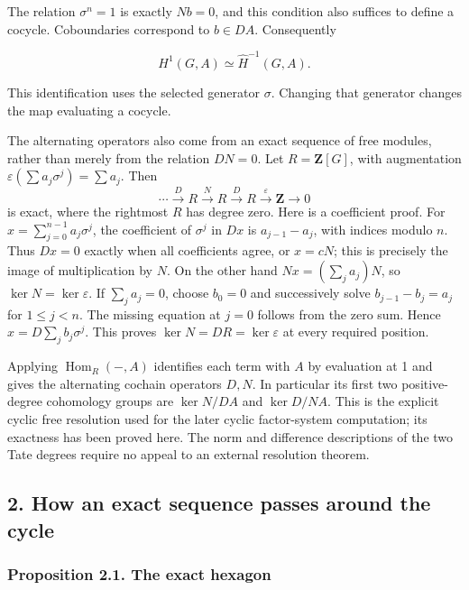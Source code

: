 \documentclass[11pt,a4paper]{article}
\begin{document}
The relation \(\sigma^n=1\) is exactly \(Nb=0\), and this condition also
suffices to define a cocycle. Coboundaries correspond to \(b\in DA\).
Consequently

\[
H^1(G,A)\simeq\widehat H^{-1}(G,A).
\]

This identification uses the selected generator \(\sigma\). Changing
that generator changes the map evaluating a cocycle.

The alternating operators also come from an exact sequence of free
modules, rather than merely from the relation \(DN=0\). Let
\(R=\mathbf Z[G]\), with augmentation
\(\varepsilon(\sum a_j\sigma^j)=\sum a_j\). Then \[
\cdots\xrightarrow{D}R\xrightarrow{N}R
\xrightarrow{D}R\xrightarrow{\varepsilon}\mathbf Z\longrightarrow0
\] is exact, where the rightmost \(R\) has degree zero. Here is a
coefficient proof. For \(x=\sum_{j=0}^{n-1}a_j\sigma^j\), the
coefficient of \(\sigma^j\) in \(Dx\) is \(a_{j-1}-a_j\), with indices
modulo \(n\). Thus \(Dx=0\) exactly when all coefficients agree, or
\(x=cN\); this is precisely the image of multiplication by \(N\). On the
other hand \(Nx=(\sum_j a_j)N\), so \(\ker N=\ker\varepsilon\). If
\(\sum_j a_j=0\), choose \(b_0=0\) and successively solve
\(b_{j-1}-b_j=a_j\) for \(1\leq j<n\). The missing equation at \(j=0\)
follows from the zero sum. Hence \(x=D\sum_j b_j\sigma^j\). This proves
\(\ker N=DR=\ker\varepsilon\) at every required position.

Applying \(\operatorname{Hom}_R(-,A)\) identifies each term with \(A\)
by evaluation at 1 and gives the alternating cochain operators \(D,N\).
In particular its first two positive-degree cohomology groups are
\(\ker N/DA\) and \(\ker D/NA\). This is the explicit cyclic free
resolution used for the later cyclic factor-system computation; its
exactness has been proved here. The norm and difference descriptions of
the two Tate degrees require no appeal to an external resolution
theorem.

\subsection{2. How an exact sequence passes around the
cycle}\label{how-an-exact-sequence-passes-around-the-cycle}

\subsubsection{Proposition 2.1. The exact
hexagon}\label{proposition-2.1.-the-exact-hexagon}
\end{document}
